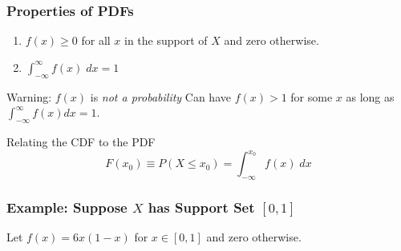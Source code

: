 \begin{frame}
  \frametitle{Properties of PDFs}

\begin{enumerate}
  \item $f(x)\geq 0$ for all $x$ in the support of $X$ and zero otherwise.
\item $\int_{-\infty}^\infty f(x) \; dx = 1$ 
\end{enumerate}

\pause

\vspace{1em}

\begin{alertblock}{Warning: $f(x)$ is \emph{not a probability}}
  Can have $f(x)>1$ for some $x$ as long as $\int_{-\infty}^\infty f(x) dx =1$.
\end{alertblock}

\pause

\vspace{1em}

\begin{block}{Relating the CDF to the PDF}
  \vspace{-1em}
  \[
  F(x_0) \equiv P(X\leq x_0) = \int_{-\infty}^{x_0} f(x) \; dx 
\]
\end{block}

\end{frame}
\begin{frame}
  \frametitle{Example: Suppose $X$ has Support Set $[0,1]$}

  Let $f(x) = 6x(1-x)$ for $x \in [0,1]$ and zero otherwise.


\end{frame}
